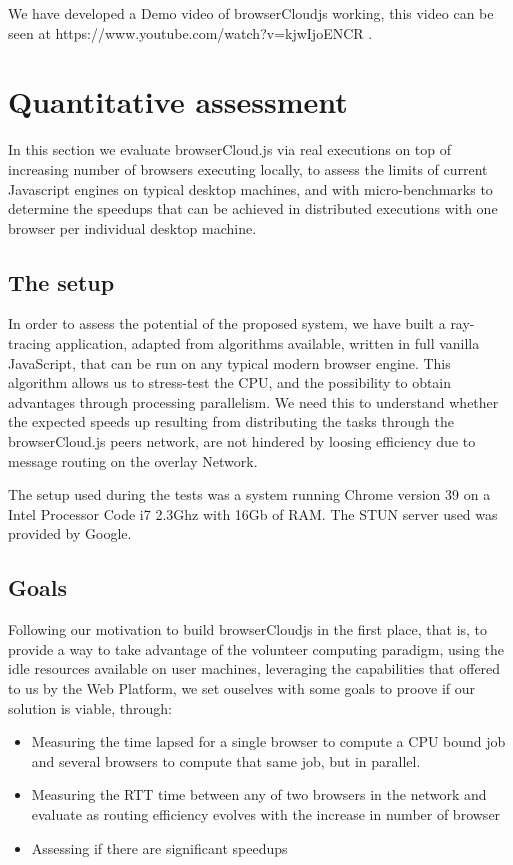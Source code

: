 We have developed a Demo video of browserCloudjs working, this video can be seen at https://www.youtube.com/watch?v=kjwIjoENCR .

\section{Quantitative assessment}

In this section we evaluate browserCloud.js via real executions on top of increasing number of browsers executing locally, to assess the limits of current Javascript engines on typical desktop machines, and with micro-benchmarks to determine the speedups that can be achieved in distributed executions with one browser per individual desktop machine.

\subsection{The setup}

In order to assess the potential of the proposed system, we have built a ray-tracing application, adapted from algorithms available, written in full vanilla JavaScript, that can be run on any typical modern browser engine. This algorithm allows us to stress-test the CPU,  and the possibility to obtain advantages through processing parallelism. We need this to understand whether the expected speeds up resulting from distributing the tasks through the browserCloud.js peers network, are not hindered by loosing efficiency due to message routing on the overlay Network.

The setup used during the tests was a system running Chrome version 39 on a Intel Processor Code i7 2.3Ghz with 16Gb of RAM. The STUN server used was provided by Google.

\subsection{Goals}

Following our motivation to build browserCloudjs in the first place, that is, to provide a way to take advantage of the volunteer computing paradigm, using the idle resources available on user machines, leveraging the capabilities that offered to us by the Web Platform, we set ouselves with some goals to proove if our solution is viable, through:

\begin{itemize}
    \item Measuring the time lapsed for a single browser to compute a CPU bound job and several browsers to compute that same job, but in parallel.
    \item Measuring the RTT time between any of two browsers in the network and evaluate as routing efficiency evolves with the increase in number of browser
    \item Assessing if there are significant speedups
\end{itemize}

